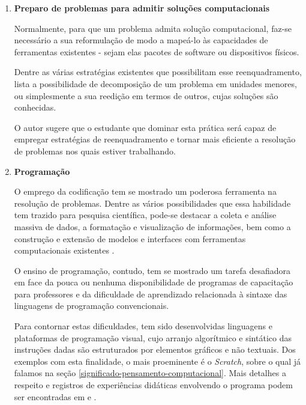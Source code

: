 \begin{enumerate}
  \item \textbf{Preparo de problemas para admitir soluções computacionais}


  Normalmente, para que um problema admita solução computacional, faz-se necessário a sua reformulação de modo a mapeá-lo às capacidades de ferramentas existentes - sejam elas pacotes de software ou dispositivos físicos. 

  Dentre as várias estratégias existentes que possibilitam esse reenquadramento,   lista a possibilidade de decomposição de um problema em unidades menores, ou simplesmente a sua reedição em termos de outros, cujas soluções são conhecidas. 

  O autor sugere que o estudante que dominar esta prática será capaz de empregar estratégias de reenquadramento e tornar mais eficiente a resolução de problemas nos quais estiver trabalhando. 

  \item \textbf{Programação} 

  O emprego da codificação tem se mostrado um poderosa ferramenta na resolução de problemas. Dentre as vários possibilidades que essa habilidade tem trazido para pesquisa científica, pode-se destacar a coleta e análise massiva de dados, a formatação e visualização de informações, bem como a construção e extensão de modelos e interfaces com ferramentas computacionais existentes \cite{Weintrop2016}. 
  
  O ensino de programação, contudo, tem se mostrado um tarefa desafiadora em face da pouca ou nenhuma disponibilidade de programas de capacitação para professores e da dificuldade de aprendizado relacionada à sintaxe das linguagens de programação convencionais. 
  
  Para contornar estas dificuldades, tem sido desenvolvidas linguagens e plataformas de programação visual, cujo arranjo algorítmico e sintático das instruções dadas são estruturados por elementos gráficos e não textuais. Dos exemplos com esta finalidade, o mais proeminente é o \textit{Scratch}, sobre o qual já falamos na seção \ref{significado-pensamento-computacional}. Mais detalhes a respeito e registros de experiências didáticas envolvendo o programa podem ser encontradas em  e .


\end{enumerate}
